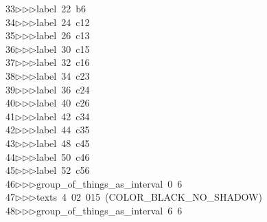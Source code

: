 \begin{tabbing}
33\>$\triangleright$\>$\triangleright$\>$\triangleright$\>label\ 22\ b6\ \\[0pt]
34\>$\triangleright$\>$\triangleright$\>$\triangleright$\>label\ 24\ c12\ \\[0pt]
35\>$\triangleright$\>$\triangleright$\>$\triangleright$\>label\ 26\ c13\ \\[0pt]
36\>$\triangleright$\>$\triangleright$\>$\triangleright$\>label\ 30\ c15\ \\[0pt]
37\>$\triangleright$\>$\triangleright$\>$\triangleright$\>label\ 32\ c16\ \\[0pt]
38\>$\triangleright$\>$\triangleright$\>$\triangleright$\>label\ 34\ c23\ \\[0pt]
39\>$\triangleright$\>$\triangleright$\>$\triangleright$\>label\ 36\ c24\ \\[0pt]
40\>$\triangleright$\>$\triangleright$\>$\triangleright$\>label\ 40\ c26\ \\[0pt]
41\>$\triangleright$\>$\triangleright$\>$\triangleright$\>label\ 42\ c34\ \\[0pt]
42\>$\triangleright$\>$\triangleright$\>$\triangleright$\>label\ 44\ c35\ \\[0pt]
43\>$\triangleright$\>$\triangleright$\>$\triangleright$\>label\ 48\ c45\ \\[0pt]
44\>$\triangleright$\>$\triangleright$\>$\triangleright$\>label\ 50\ c46\ \\[0pt]
45\>$\triangleright$\>$\triangleright$\>$\triangleright$\>label\ 52\ c56\ \\[0pt]
46\>$\triangleright$\>$\triangleright$\>$\triangleright$\>group\_of\_things\_as\_interval\ 0\ 6\ \\[0pt]
47\>$\triangleright$\>$\triangleright$\>$\triangleright$\>texts\ 4\ 02\ 015\ (COLOR\_BLACK\_NO\_SHADOW)\ \\[0pt]
48\>$\triangleright$\>$\triangleright$\>$\triangleright$\>group\_of\_things\_as\_interval\ 6\ 6\ \\[0pt]

\end{tabbing}
